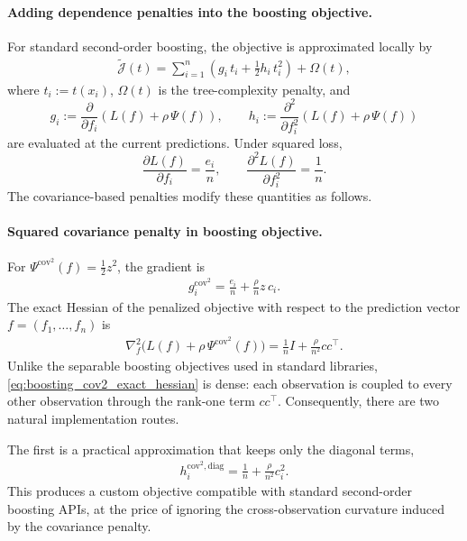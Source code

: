 \documentclass[12pt]{article}
\theoremstyle{plain}
\theoremstyle{definition}
\newcommand{\1}{\mathbf{1}}
\begin{document}
\paragraph{Adding dependence penalties into the boosting objective.}
For standard second-order boosting, the objective is approximated locally by
\begin{align}
    \label{eq:boosting_local_objective}
    \widetilde{\mathcal J}(t)
    =
    \sum_{i=1}^n
    \left(
        g_i\,t_i + \frac{1}{2}h_i\,t_i^2
    \right)
    +
    \Omega(t),
\end{align}
where \(t_i := t(x_i)\), \(\Omega(t)\) is the tree-complexity penalty, and
\[
g_i := \frac{\partial}{\partial f_i}
\left(
L(f) + \rho\,\Psi(f)
\right),
\qquad
h_i := \frac{\partial^2}{\partial f_i^2}
\left(
L(f) + \rho\,\Psi(f)
\right)
\]
are evaluated at the current predictions. Under squared loss,
\[
\frac{\partial L(f)}{\partial f_i} = \frac{e_i}{n},
\qquad
\frac{\partial^2 L(f)}{\partial f_i^2} = \frac{1}{n}.
\]
The covariance-based penalties modify these quantities as follows.

\paragraph{Squared covariance penalty in boosting objective.}
For \(\Psi^{\mathrm{cov}^2}(f)=\tfrac12 z^2\), the gradient is
\begin{align}
    \label{eq:boosting_cov2_gradient}
    g_i^{\mathrm{cov}^2}
    =
    \frac{e_i}{n}
    +
    \frac{\rho}{n}z\,c_i.
\end{align}
The exact Hessian of the penalized objective with respect to the prediction vector \(f=(f_1,\dots,f_n)\) is
\begin{align}
    \label{eq:boosting_cov2_exact_hessian}
    \nabla_f^2
    \bigl(L(f)+\rho\,\Psi^{\mathrm{cov}^2}(f)\bigr)
    =
    \frac{1}{n}I
    +
    \frac{\rho}{n^2}cc^\top.
\end{align}
Unlike the separable boosting objectives used in standard libraries, \eqref{eq:boosting_cov2_exact_hessian} is dense: each observation is coupled to every other observation through the rank-one term \(cc^\top\). Consequently, there are two natural implementation routes.

The first is a practical approximation that keeps only the diagonal terms,
\begin{align}
    \label{eq:boosting_cov2_diag_hessian}
    h_i^{\mathrm{cov}^2,\mathrm{diag}}
    =
    \frac{1}{n}
    +
    \frac{\rho}{n^2}c_i^2.
\end{align}
This produces a custom objective compatible with standard second-order boosting APIs, at the price of ignoring the cross-observation curvature induced by the covariance penalty.
\end{document}
